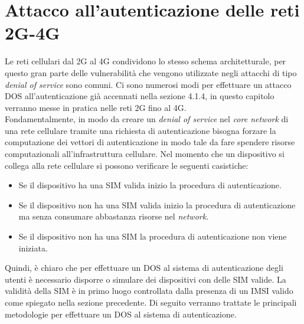 \chapter{Attacco all'autenticazione delle reti 2G-4G}
Le reti cellulari dal 2G al 4G condividono lo stesso schema architetturale, per questo gran parte delle vulnerabilità che vengono
utilizzate negli attacchi di tipo \textit{denial of service} sono comuni.
Ci sono numerosi modi per effettuare un attacco DOS all'autenticazione già accennati nella sezione 4.1.4, in questo capitolo verranno messe in pratica 
nelle reti 2G fino al 4G.\\
Fondamentalmente, in modo da creare un \textit{denial of service} nel \textit{core network} di una rete cellulare tramite una richiesta di autenticazione bisogna forzare
la computazione dei vettori di autenticazione in modo tale da fare spendere risorse computazionali all'infrastruttura cellulare.
Nel momento che un dispositivo si collega alla rete cellulare si possono verificare le seguenti casistiche:
\begin{itemize}
    \item Se il dispositivo ha una SIM valida inizio la procedura di autenticazione.
    \item Se il dispositivo non ha una SIM valida inizio la procedura di autenticazione ma senza consumare abbastanza risorse nel \textit{network}.
    \item Se il dispositivo non ha una SIM la procedura di autenticazione non viene iniziata.
\end{itemize}
Quindi, è chiaro che per effettuare un DOS al sistema di autenticazione degli utenti è necessario disporre o simulare dei dispositivi con delle SIM valide. La validità della SIM è 
in primo luogo controllata dalla presenza di un IMSI valido come spiegato nella sezione precedente.
Di seguito verranno trattate le principali metodologie per effettuare un DOS al sistema di autenticazione.

\clearpage

